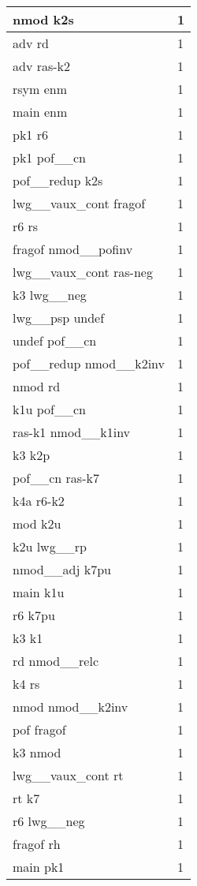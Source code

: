 \documentclass[a4 paper]{article}
\begin{document}
\begin{longtable}{p{}p{}}
nmod k2s  & 1 \\ \midrule
adv rd  & 1 \\ \midrule
adv ras-k2  & 1 \\ \midrule
rsym enm  & 1 \\ \midrule
main enm  & 1 \\ \midrule
pk1 r6  & 1 \\ \midrule
pk1 pof\_\_cn  & 1 \\ \midrule
pof\_\_redup k2s  & 1 \\ \midrule
lwg\_\_vaux\_cont fragof  & 1 \\ \midrule
r6 rs  & 1 \\ \midrule
fragof nmod\_\_pofinv  & 1 \\ \midrule
lwg\_\_vaux\_cont ras-neg  & 1 \\ \midrule
k3 lwg\_\_neg  & 1 \\ \midrule
lwg\_\_psp undef  & 1 \\ \midrule
undef pof\_\_cn  & 1 \\ \midrule
pof\_\_redup nmod\_\_k2inv  & 1 \\ \midrule
nmod rd  & 1 \\ \midrule
k1u pof\_\_cn  & 1 \\ \midrule
ras-k1 nmod\_\_k1inv  & 1 \\ \midrule
k3 k2p  & 1 \\ \midrule
pof\_\_cn ras-k7  & 1 \\ \midrule
k4a r6-k2  & 1 \\ \midrule
mod k2u  & 1 \\ \midrule
k2u lwg\_\_rp  & 1 \\ \midrule
nmod\_\_adj k7pu  & 1 \\ \midrule
main k1u  & 1 \\ \midrule
r6 k7pu  & 1 \\ \midrule
k3 k1  & 1 \\ \midrule
rd nmod\_\_relc  & 1 \\ \midrule
k4 rs  & 1 \\ \midrule
nmod nmod\_\_k2inv  & 1 \\ \midrule
pof fragof  & 1 \\ \midrule
k3 nmod  & 1 \\ \midrule
lwg\_\_vaux\_cont rt  & 1 \\ \midrule
rt k7  & 1 \\ \midrule
r6 lwg\_\_neg  & 1 \\ \midrule
fragof rh  & 1 \\ \midrule
main pk1  & 1 \\ \midrule

\end{longtable}
\end{document}
